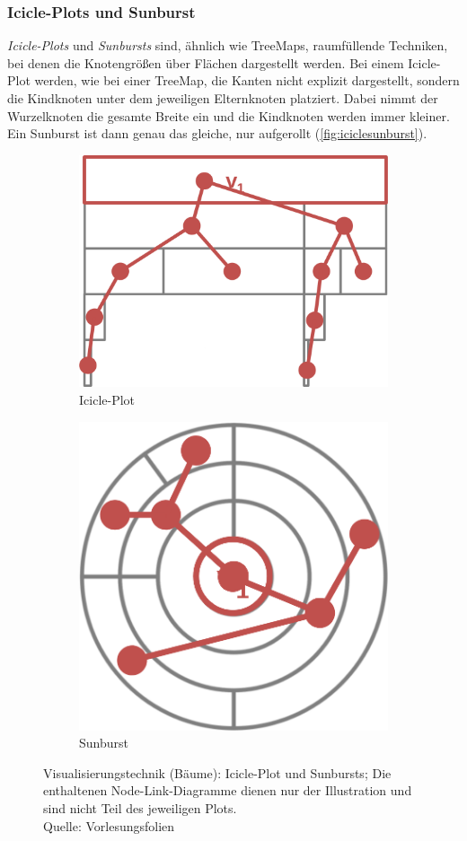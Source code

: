 			\subsubsection{Icicle-Plots und Sunburst}
				\emph{Icicle-Plots} und \emph{Sunbursts} sind, ähnlich wie TreeMaps, raumfüllende Techniken, bei denen die Knotengrößen über Flächen dargestellt werden. Bei einem Icicle-Plot werden, wie bei einer TreeMap, die Kanten nicht explizit dargestellt, sondern die Kindknoten unter dem jeweiligen Elternknoten platziert. Dabei nimmt der Wurzelknoten die gesamte Breite ein und die Kindknoten werden immer kleiner. Ein Sunburst ist dann genau das gleiche, nur aufgerollt (\autoref{fig:iciclesunburst}).

				\begin{figure}
					\centering
					\begin{subfigure}{0.49\linewidth}
						\centering
						\includegraphics[width=0.5\linewidth]{icicle}
						\caption{Icicle-Plot}
					\end{subfigure}
					\hfill
					\begin{subfigure}{0.49\linewidth}
						\centering
						\includegraphics[width=0.5\linewidth]{sunburst}
						\caption{Sunburst}
					\end{subfigure}
					\caption[Visualisierungstechnik (Bäume): Icicle-Plot und Sunbursts]{Visualisierungstechnik (Bäume): Icicle-Plot und Sunbursts; Die enthaltenen Node-Link-Diagramme dienen nur der Illustration und sind nicht Teil des jeweiligen Plots.\\Quelle: Vorlesungsfolien}
					\label{fig:iciclesunburst}
				\end{figure}

